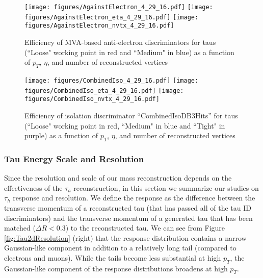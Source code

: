 \begin{figure}[tbh!]
    \centering
   
      \texttt{[image: figures/AgainstElectron\_4\_29\_16.pdf]}
      \texttt{[image: figures/AgainstElectron\_eta\_4\_29\_16.pdf]}
       \texttt{[image: figures/AgainstElectron\_nvtx\_4\_29\_16.pdf]}

    \caption{Efficiency of MVA-based anti-electron discriminators for taus (``Loose" working point in red and ``Medium" in blue) as a function of $p_{T}$, $\eta$, and number of reconstructed vertices}
    \label{fig:EM5}
  \end{figure}

\begin{figure}[tbh!]
    \centering
    
      \texttt{[image: figures/CombinedIso\_4\_29\_16.pdf]}
      \texttt{[image: figures/CombinedIso\_eta\_4\_29\_16.pdf]}
       \texttt{[image: figures/CombinedIso\_nvtx\_4\_29\_16.pdf]}
    
    \caption{Efficiency of isolation discriminator ``CombinedIsoDB3Hits'' for taus (``Loose" working point in red,  ``Medium" in blue and ``Tight" in purple) as a function of $p_{T}$, $\eta$, and number of reconstructed vertices}
    \label{fig:TIso}
  \end{figure}



\subsubsection{Tau Energy Scale and Resolution}

Since the resolution and scale of our mass reconstruction depends on the effectiveness of the $\tau_{h}$ reconstruction, in this section we summarize our studies on $\tau_{h}$ response and resolution. We define the response as the difference between the transverse momentum of a reconstructed tau (that has passed all of the tau ID discriminators) and the transverse momentum of a generated tau that has been matched ($\Delta R < 0.3$) to the reconstructed tau. We can see from Figure \ref{fig:Tau2dResolution} (right) that the response distribution contains a narrow Gaussian-like component  in addition to a relatively long tail (compared to electrons and muons). While the tails become less substantial at high $p_{T}$, the Gaussian-like component of the response distributions broadens at high $p_{T}$.
 
